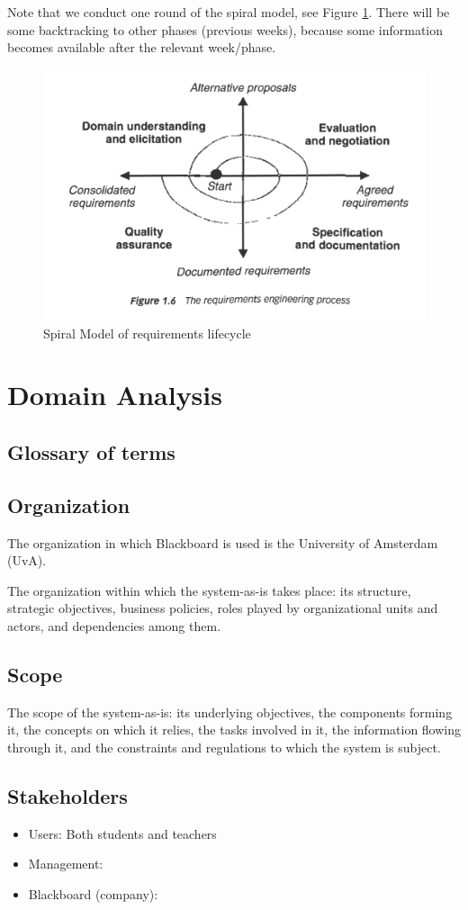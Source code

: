 Note that we conduct one round of the spiral model, see Figure \ref{fig:spiral_model}. There will be some backtracking to other phases (previous weeks), because some information becomes available after the relevant week/phase. 
\begin{figure}[h]
	\centering
	\includegraphics[width=0.6\linewidth]{images/re_process}
	\caption{Spiral Model of requirements lifecycle}
	\label{fig:spiral_model}
\end{figure}
\chapter{Domain Analysis}

\section{Glossary of terms}

\section{Organization}
The organization in which Blackboard is used is the University of Amsterdam (UvA). 

The organization within which the system-as-is takes place: its structure, strategic objectives,
business policies, roles played by organizational units and actors, and dependencies
among them.

\section{Scope}
The scope of the system-as-is: its underlying objectives, the components forming it, the
concepts on which it relies, the tasks involved in it, the information flowing through it,
and the constraints and regulations to which the system is subject.

\section{Stakeholders}
\begin{itemize}
	\item Users: Both students and teachers
	\item Management:
	\item Blackboard (company):
\end{itemize}

